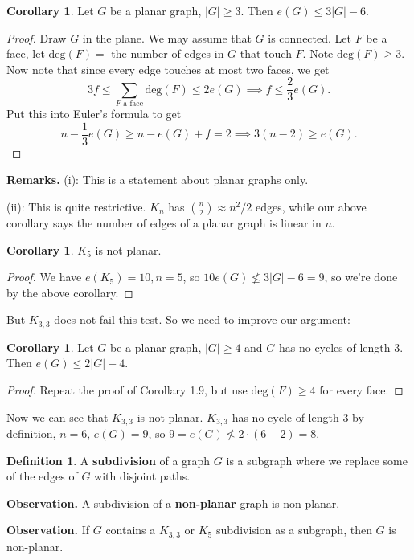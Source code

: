 \documentclass{article}
\theoremstyle{definition}
\newtheorem{cor}[theorem]{Corollary}
\newtheorem{defn}{Definition}[section]
\begin{document}
\begin{cor}
    Let $G$ be a planar graph, $|G| \ge 3$. Then $e(G) \le 3|G| - 6$.
\end{cor}
\begin{proof}
    Draw $G$ in the plane. We may assume that $G$ is connected. Let $F$ be a face, let $\text{deg}(F) =$ the number of edges in $G$ that touch $F$. Note $\text{deg}(F) \ge 3$. Now note that since every edge touches at most two faces, we get $$3f \le \sum_{F \text{ a face}}^{} \text{deg}(F) \le 2 e(G) \implies f\le \frac{2}{3}e(G).$$
    Put this into Euler's formula to get $$n - \frac{1}{3}e(G) \ge n - e(G) + f =2 \implies 3(n-2) \ge e(G).$$
\end{proof}
\textbf{Remarks.} (i): This is a statement about planar graphs only.

(ii): This is quite restrictive. $K_n$ has ${{n} \choose {2}} \approx n^2/2$ edges, while our above corollary says the number of edges of a planar graph is linear in $n$.

\begin{cor}
    $K_5$ is not planar.
\end{cor}
\begin{proof}
    We have $e(K_5)=10, n=5$, so $10 e(G) \not \le 3|G|-6 = 9$, so we're done by the above corollary.
\end{proof}
But $K_{3,3}$ does not fail this test. So we need to improve our argument:
\begin{cor}
    Let $G$ be a planar graph, $|G|\ge 4$ and $G$ has no cycles of length $3$. Then $e(G) \le 2|G| - 4$.
\end{cor}
\begin{proof}
    Repeat the proof of Corollary 1.9, but use $\text{deg}(F) \ge 4$ for every face.
\end{proof}
Now we can see that $K_{3,3}$ is not planar. $K_{3,3}$ has no cycle of length 3 by definition, $n=6$, $e(G)=9$, so $9 = e(G) \not \le 2\cdot (6-2) = 8$.


\begin{defn}
    A \textbf{subdivision}  of a graph $G$ is a subgraph where we replace some of the edges of $G$ with disjoint paths.
\end{defn}
\textbf{Observation.} A subdivision of a \textbf{non-planar}  graph is non-planar.

\textbf{Observation.} If $G$ contains a $K_{3,3}$ or $K_5$ subdivision as a subgraph, then $G$ is non-planar.
\end{document}
